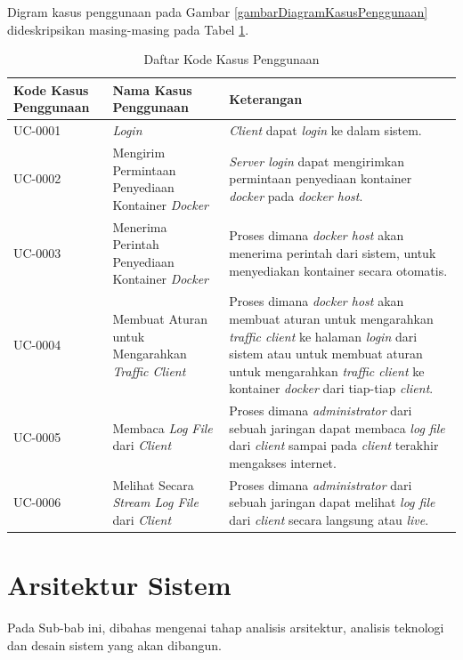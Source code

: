 	Digram kasus penggunaan pada Gambar \ref{gambarDiagramKasusPenggunaan} dideskripsikan masing-masing pada Tabel \ref{tabelKodeKasusPenggunaan}.
    \begin{longtable}{|p{}|p{}|p{}|} %

\caption{Daftar Kode Kasus Penggunaan} \label{tabelKodeKasusPenggunaan} \\
\hline
\textbf{Kode Kasus Penggunaan} & \textbf{Nama Kasus Penggunaan} & \textbf{Keterangan} \\ \hline

\endhead
\endfoot
\endlastfoot

UC-0001 & \textit{Login} & \textit{Client} dapat \textit{login} ke dalam sistem. \\ \hline
UC-0002 & Mengirim Permintaan Penyediaan Kontainer \textit{Docker} & \textit{Server login} dapat mengirimkan permintaan penyediaan kontainer \textit{docker} pada \textit{docker host}. \\ \hline
UC-0003 & Menerima Perintah Penyediaan Kontainer \textit{Docker}  &  Proses dimana \textit{docker host} akan menerima perintah dari sistem, untuk menyediakan kontainer secara otomatis.\\ \hline
UC-0004 & Membuat Aturan untuk Mengarahkan \textit{Traffic Client}  &  Proses dimana \textit{docker host} akan membuat aturan untuk mengarahkan \textit{traffic client} ke halaman \textit{login} dari sistem atau untuk membuat aturan untuk mengarahkan \textit{traffic client} ke kontainer \textit{docker} dari tiap-tiap \textit{client}. \\ \hline
UC-0005 & Membaca \textit{Log File} dari \textit{Client}  &  Proses dimana \textit{administrator} dari sebuah jaringan dapat membaca \textit{log file} dari \textit{client} sampai pada \textit{client} terakhir mengakses internet.\\ \hline
UC-0006 & Melihat Secara \textit{Stream Log File} dari \textit{Client}  &  Proses dimana \textit{administrator} dari sebuah jaringan dapat melihat \textit{log file} dari \textit{client} secara langsung atau \textit{live}.\\ \hline
\end{longtable}

  \section{Arsitektur Sistem}
  	Pada Sub-bab ini, dibahas mengenai tahap analisis arsitektur, analisis teknologi dan desain sistem yang akan dibangun.
